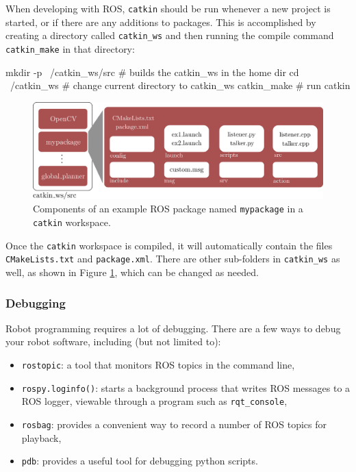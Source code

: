 When developing with ROS, \texttt{catkin} should be run whenever a new project is started, or if there are any additions to packages. This is accomplished by creating a directory called \texttt{catkin\_ws} and then running the compile command \texttt{catkin\_make} in that directory:
\begin{gencode}
mkdir -p ~/catkin_ws/src  # builds the catkin_ws in the home dir
cd ~/catkin_ws            # change current directory to catkin_ws
catkin_make               # run catkin
\end{gencode}

\begin{figure}[t] 
    \centering 
    \includegraphics[width=0.75\linewidth]{tex/figs/ch24_figs/catkin_ws.png}
    \caption{Components of an example ROS package named \texttt{mypackage} in a \texttt{catkin} workspace.}
    \label{catkin} 
\end{figure} 

Once the \texttt{catkin} workspace is compiled, it will automatically contain the files \texttt{CMakeLists.txt} and \texttt{package.xml}. There are other sub-folders in \texttt{catkin\_ws} as well, as shown in Figure \ref{catkin}, which can be changed as needed.

\subsubsection{Debugging}
Robot programming requires a lot of debugging. There are a few ways to debug your robot software, including (but not limited to): 
\begin{itemize}
    \item \verb|rostopic|: a tool that monitors ROS topics in the command line,
    \item \verb|rospy.loginfo()|: starts a background process that writes ROS messages to a ROS logger, viewable through a program such as \verb|rqt_console|,
    \item \verb|rosbag|: provides a convenient way to record a number of ROS topics for playback,
    \item \texttt{pdb}: provides a useful tool for debugging python scripts.
\end{itemize}

